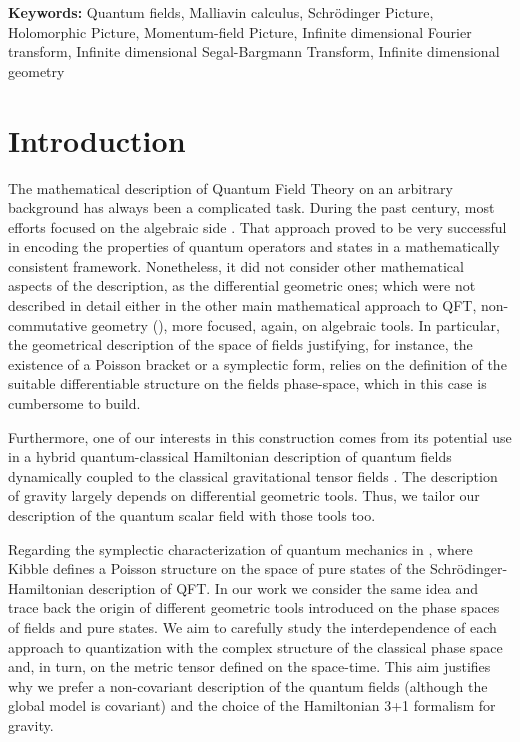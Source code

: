 \documentclass[12pt]{article}%
\begin{document}
\textbf{Keywords: }{Quantum fields,  Malliavin calculus, Schrödinger Picture, Holomorphic Picture, Momentum-field Picture, Infinite dimensional Fourier transform, Infinite dimensional Segal-Bargmann Transform, Infinite dimensional geometry}



\maketitle

\tableofcontents

\section{Introduction}

The mathematical description of Quantum Field Theory on an arbitrary background has always been a complicated task. During the past century, most efforts focused on the algebraic side \cite{Haag1964, Streater1989,Doplicher1969,Doplicher1969a,Doplicher1971,Doplicher1974,Buchholz1982,Buchholz2020,Brunetti2015}. That approach proved to be very successful in encoding the properties of quantum operators and states in a mathematically consistent framework. Nonetheless, it did not consider other mathematical aspects of the description, as  the differential geometric ones; which were not described in detail either in the other main mathematical approach to QFT, non-commutative geometry (\cite{connesNoncommutativeGeometry1994,connesRenormalizationQuantumField2000}), more focused, again, on algebraic tools.   In particular, the geometrical description of the space of fields justifying, for instance, the existence of a Poisson bracket or  a symplectic form, relies on the definition of the suitable differentiable structure on the fields phase-space, which in this case is cumbersome to build. 

 Furthermore, one of our interests in this construction comes from its potential use in a hybrid quantum-classical Hamiltonian description of quantum fields dynamically coupled to the classical gravitational tensor fields \cite{alonso2023d}. The description of gravity largely depends on differential geometric tools. Thus, we tailor our  description of  the quantum scalar field  with those tools too.
 
 Regarding the symplectic characterization of quantum mechanics in  \cite{Kibble1979}, where Kibble defines a Poisson structure on the space of pure states of the Schrödinger-Hamiltonian description of  QFT. 
 In our work we consider the same idea and trace back the origin of different geometric tools  introduced on the phase spaces of fields and pure states. We aim to carefully study the interdependence of each approach to quantization with the complex structure of the classical phase space and, in turn, on the metric tensor defined on the space-time.  This aim justifies why we prefer  a non-covariant description of the quantum fields (although the global model is covariant) and the choice of the Hamiltonian 3+1 formalism for  gravity.      
\end{document}
